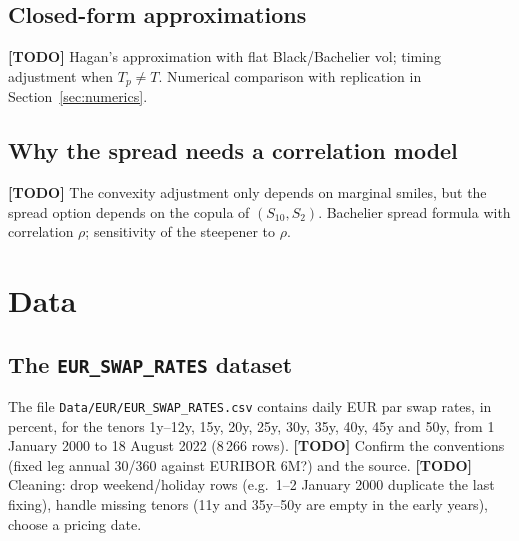 \documentclass[11pt,a4paper]{article}
\theoremstyle{plain}
\theoremstyle{definition}
\newcommand{\todo}[1]{\textcolor{red!70!black}{\textbf{[TODO]} #1}}
\begin{document}
\subsection{Closed-form approximations}
\todo{Hagan's approximation with flat Black/Bachelier vol; timing adjustment when $T_p\neq T$. Numerical comparison with replication in Section~\ref{sec:numerics}.}

\subsection{Why the spread needs a correlation model}
\todo{The convexity adjustment only depends on marginal smiles, but the spread option depends on the copula of $(S_{10},S_{2})$. Bachelier spread formula with correlation $\rho$; sensitivity of the steepener to $\rho$.}

\clearpage
\section{Data}
\label{sec:data}

\subsection{The \texttt{EUR\_SWAP\_RATES} dataset}
The file \texttt{Data/EUR/EUR\_SWAP\_RATES.csv} contains daily EUR par swap rates, in percent, for the tenors 1y--12y, 15y, 20y, 25y, 30y, 35y, 40y, 45y and 50y, from 1 January 2000 to 18 August 2022 (8\,266 rows).
\todo{Confirm the conventions (fixed leg annual 30/360 against EURIBOR 6M?) and the source.}
\todo{Cleaning: drop weekend/holiday rows (e.g.\ 1--2 January 2000 duplicate the last fixing), handle missing tenors (11y and 35y--50y are empty in the early years), choose a pricing date.}
\end{document}
